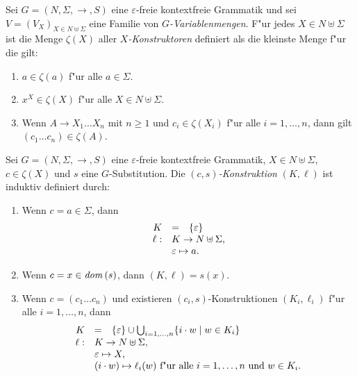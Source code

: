 \documentclass[12pt,a4paper]{article}
\begin{document}
\begin{definition}[Konstruktoren]
  Sei $G = (N,\Sigma,\to,S)$ eine $\varepsilon$-freie kontextfreie Grammatik und sei
  $V = (V_X)_{X \in N \uplus \Sigma}$ eine Familie von \emph{$G$-Variablenmengen}. F"ur
  jedes $X \in N \uplus \Sigma$ ist die Menge $\zeta(X)$ aller \emph{$X$-Konstruktoren}
  definiert als die kleinste Menge f"ur die gilt:
  \begin{enumerate}
  \item $a \in \zeta(a)$ f"ur alle $a \in \Sigma$.
  \item $x^X \in \zeta(X)$ f"ur alle $X \in N \uplus \Sigma$.
  \item Wenn $A \to X_1 \ldots X_n$ mit $n \ge 1$ und $c_i \in \zeta(X_i)$ f"ur alle
    $i=1,\ldots,n$, dann gilt $(c_1 \ldots c_n) \in \zeta(A)$.
  \end{enumerate}
\end{definition}

\begin{definition}[Konstruktion]
  Sei $G = (N,\Sigma,\to,S)$ eine $\varepsilon$-freie kontextfreie Grammatik, $X \in N \uplus \Sigma$,
  $c \in \zeta(X)$ und $s$ eine $G$-Substitution. Die
  \emph{$(c,s)$-Konstruktion} $(K,\ell)$ ist induktiv definiert durch:
  \begin{enumerate}
  \item Wenn $c = a \in \Sigma$, dann
    \[\begin{array}{rcl}
      K &=& \{\varepsilon\} \\
      \ell: & \multicolumn{2}{l}{K \to N \uplus \Sigma,} \\
      & \multicolumn{2}{l}{\varepsilon \mapsto a.} \\
    \end{array}\]
  \item Wenn $c = x \in \mathit{dom}\,(s)$, dann $(K,\ell) = s(x)$.
  \item Wenn $c = (c_1 \ldots c_n)$ und existieren $(c_i,s)$-Konstruktionen $(K_i,\ell_i)$ f"ur alle
    $i=1,\ldots,n$, dann
    \[\begin{array}{rcl}
      K &=& \{\varepsilon\} \cup \bigcup_{i=1,\ldots,n} \{i \cdot w \mid w \in K_i\} \\
      \ell: & \multicolumn{2}{l}{K \to N \uplus \Sigma,} \\
      & \multicolumn{2}{l}{\varepsilon \mapsto X,} \\
      & \multicolumn{2}{l}{(i \cdot w) \mapsto \ell_i(w) \text{ f"ur alle $i=1,\ldots,n$ und $w \in K_i$.}}
    \end{array}\]
  \end{enumerate}
\end{definition}
\end{document}
